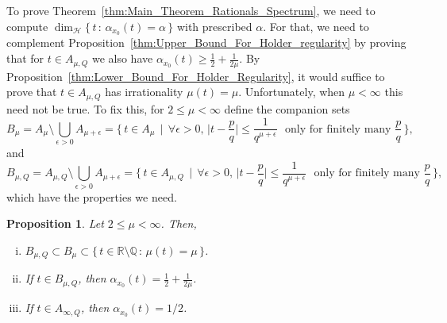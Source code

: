 \documentclass[11pt,reqno]{amsart}
\newtheorem{prop}[thm]{Proposition}
\theoremstyle{definition}
\begin{document}
To prove Theorem~\ref{thm:Main_Theorem_Rationals_Spectrum}, 
we need to compute 
 $\operatorname{dim}_{\mathcal H}\{ \, t \, : \, \alpha_{x_0}(t) = \alpha  \,   \}$
with prescribed $\alpha$. 
For that, we need to complement Proposition~\ref{thm:Upper_Bound_For_Holder_regularity}
by proving that for $t  \in A_{\mu,Q}$ we also have $\alpha_{x_0}(t) \geq \frac12 + \frac{1}{2\mu}$. 
By Proposition~\ref{thm:Lower_Bound_For_Holder_Regularity}, 
it would suffice to prove that  $t \in  A_{\mu,Q}$ has irrationality $\mu (t) = \mu$. 
Unfortunately, when $\mu < \infty$ this need not be true.
To fix this, for $2 \leq \mu < \infty$ define the companion sets 
\begin{equation}
 B_\mu   = A_\mu \setminus \bigcup_{\epsilon > 0} A_{\mu + \epsilon} 
 = \Big\{ \, t \in  A_\mu \, \mid \,   \forall \epsilon > 0, \,  \big| t - \frac{p}{q} \big| \leq \frac{1}{q^{\mu + \epsilon}} \, \, \text{ only for finitely many } \frac{p}{q} \,    \Big\},
\end{equation} 
and
\begin{equation}\label{eq:B_Mu_Q}
 B_{\mu,Q}  = A_{\mu,Q}  \setminus \bigcup_{\epsilon > 0} A_{\mu + \epsilon}  
 = \Big\{ \, t \in  A_{\mu,Q} \, \mid \,   \forall \epsilon > 0, \,  \big| t - \frac{p}{q} \big| \leq \frac{1}{q^{\mu + \epsilon}} \, \, \text{ only for finitely many } \frac{p}{q} \,    \Big\},
\end{equation} 
which have the properties we need. 
\begin{prop}\label{thm:Holder_Regularity_In_Bmu}
Let $2 \leq \mu < \infty$. Then, 
\begin{enumerate}[(i)]
	\item $  B_{\mu,Q} \subset B_\mu \subset \{   \,  t \in \mathbb R \setminus \mathbb Q  \, : \, \mu(t) = \mu \,      \}$.   
	\item If $t \in B_{\mu,Q}$, then $\alpha_{x_0}(t) = \frac12 + \frac{1}{2\mu}$.    
\item If $t \in A_{\infty,Q}$, then $\alpha_{x_0}(t) = 1/2$.  
\end{enumerate}
\end{prop}
\end{document}

